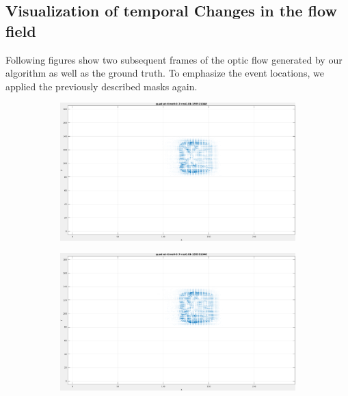\begin{appendix}
\chapter{Visualization of temporal Changes in the flow field}
Following figures show two subsequent frames of the optic flow generated by our algorithm as well as the ground truth.
To emphasize the event locations, we applied the previously described masks again.

\begin{figure}[tb]
\centering
\begin{subfigure}{.45\textwidth}
  \centering
  \includegraphics[height=.6\linewidth]{figs/quadrat/quadrat-1.png}
  \caption{}
\end{subfigure}
\begin{subfigure}{.45\textwidth}
  \centering
  \includegraphics[height=.6\linewidth]{figs/quadrat/quadrat-2.png}
  \caption{}
\end{subfigure}
\begin{subfigure}{.45\textwidth}

\end{subfigure}
\end{figure}
\end{appendix}
